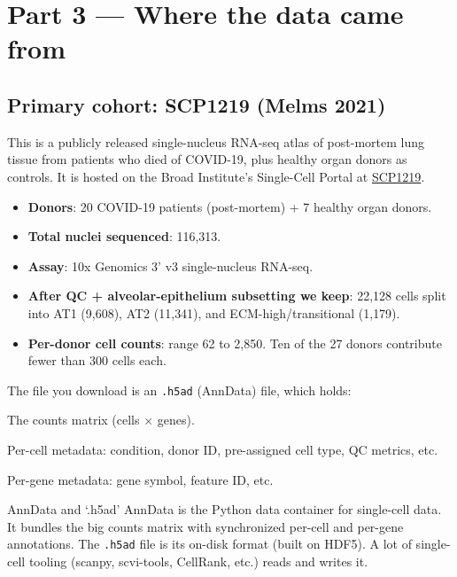 \documentclass[11pt]{article}
\begin{document}
\section{Part 3 --- Where the data came from}

\subsection{Primary cohort: SCP1219 (Melms 2021)}

This is a publicly released single-nucleus RNA-seq atlas of post-mortem lung
tissue from patients who died of COVID-19, plus healthy organ donors as
controls. It is hosted on the Broad Institute's Single-Cell Portal at
\href{https://singlecell.broadinstitute.org/single_cell/study/SCP1219}{SCP1219}.

\begin{itemize}
\item \textbf{Donors}: 20 COVID-19 patients (post-mortem) + 7 healthy organ donors.
\item \textbf{Total nuclei sequenced}: 116{,}313.
\item \textbf{Assay}: 10x Genomics 3' v3 single-nucleus RNA-seq.
\item \textbf{After QC + alveolar-epithelium subsetting we keep}:
      22{,}128 cells split into AT1 (9{,}608), AT2 (11{,}341), and
      ECM-high/transitional (1{,}179).
\item \textbf{Per-donor cell counts}: range 62 to 2{,}850. Ten of the 27
      donors contribute fewer than 300 cells each.
\end{itemize}

The file you download is an \texttt{.h5ad} (AnnData) file, which holds:
\begin{description}[style=nextline]
\item[\texttt{adata.X}] The counts matrix (cells $\times$ genes).
\item[\texttt{adata.obs}] Per-cell metadata: condition, donor ID,
      pre-assigned cell type, QC metrics, etc.
\item[\texttt{adata.var}] Per-gene metadata: gene symbol, feature ID, etc.
\end{description}

\begin{jargon}{AnnData and `.h5ad'}
AnnData is the Python data container for single-cell data. It bundles the
big counts matrix with synchronized per-cell and per-gene annotations.
The \texttt{.h5ad} file is its on-disk format (built on HDF5). A lot of
single-cell tooling (scanpy, scvi-tools, CellRank, etc.) reads and writes it.
\end{jargon}
\end{document}
